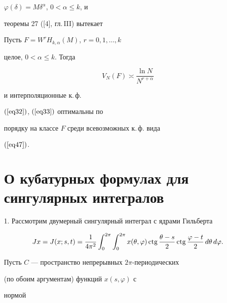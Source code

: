 $\varphi(\delta)=M\delta^\alpha$, $0<\alpha\leq k$, и


теоремы 27 ([4], гл.\,III) вытекает








\begin{thm}\label{th7}


Пусть $F=W^rH_{k,\alpha}(M)$, $r=0,1,\dotsc,k$


целое, $0<\alpha\leq k$. Тогда


$$


V_N(F)\asymp\frac{\ln N}{N^{r+\alpha}}


$$


и интерполяционные к.\,ф. 


$(\ref{eq32})$, $(\ref{eq33})$ оптимальны по 


порядку на классе $F$ среди всевозможных к.\,ф.  вида


$(\ref{eq47})$.


\end{thm}








\section{О кубатурных формулах для сингулярных интегралов}








1. Рассмотрим двумерный сингулярный интеграл с ядрами Гильберта


\begin{equation}\label{eq48}


Jx=J(x;s,t)=\frac{1}{4\pi^2}\int_0^{2\pi}\int_0^{2\pi}


x(\theta,\varphi)\ctg\frac{\theta-s}{2}


\ctg\frac{\varphi-t}{2}\,d\theta\,d\varphi.


\end{equation}





Пусть $C$ --- пространство непрерывных $2\pi$-периодических


(по обоим аргументам) функций $x(s,\varphi)$ с


нормой


$$


